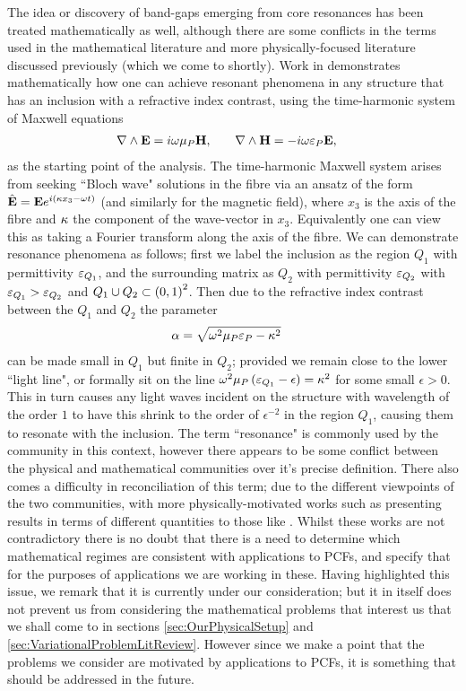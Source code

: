 The idea or discovery of band-gaps emerging from core resonances has been treated mathematically as well, although there are some conflicts in the terms used in the mathematical literature and more physically-focused literature discussed previously (which we come to shortly).
Work in \cite{cooper2014band} demonstrates mathematically how one can achieve resonant phenomena in any structure that has an inclusion with a refractive index contrast, using the time-harmonic system of Maxwell equations
\begin{align*}
	\nabla\wedge\mathbf{E} &= i\omega\mu_{P}\mathbf{H}, &\quad \nabla\wedge\mathbf{H} &= -i\omega\varepsilon_{P}\mathbf{E},
\end{align*}
as the starting point of the analysis.
The time-harmonic Maxwell system arises from seeking ``Bloch wave" solutions in the fibre via an ansatz of the form $\hat{\mathbf{E}}=\mathbf{E}e^{i\left( \kappa x_3-\omega t \right)}$ (and similarly for the magnetic field), where $x_3$ is the axis of the fibre and $\kappa$ the component of the wave-vector in $x_3$.
Equivalently one can view this as taking a Fourier transform along the axis of the fibre.
We can demonstrate resonance phenomena as follows; first we label the inclusion as the region $Q_1$ with permittivity $\varepsilon_{Q_1}$, and the surrounding matrix as $Q_2$ with permittivity $\varepsilon_{Q_2}$ with $\varepsilon_{Q_1}>\varepsilon_{Q_2}$ and $Q_1\cup Q_2\subset\left( 0,1 \right)^2$.
Then due to the refractive index contrast between the $Q_1$ and $Q_2$ the parameter
\begin{align*}
	\alpha &= \sqrt{\omega^2\mu_{P}\varepsilon_{P} - \kappa^2}
\end{align*}
can be made small in $Q_1$ but finite in $Q_2$; provided we remain close to the lower ``light line", or formally sit on the line $\omega^2\mu_{P}\left( \varepsilon_{Q_1}-\epsilon \right) = \kappa^2$ for some small $\epsilon>0$.
This in turn causes any light waves incident on the structure with wavelength of the order $1$ to have this shrink to the order of $\epsilon^{-2}$ in the region $Q_1$, causing them to resonate with the inclusion.
The term ``resonance" is commonly used by the community in this context, however there appears to be some conflict between the physical and mathematical communities over it's precise definition.
There also comes a difficulty in reconciliation of this term; due to the different viewpoints of the two communities, with more physically-motivated works such as \cite{birks2004scaling} presenting results in terms of different quantities to those like \cite{cooper2014band}.
Whilst these works are not contradictory there is no doubt that there is a need to determine which mathematical regimes are consistent with applications to PCFs, and specify that for the purposes of applications we are working in these.
Having highlighted this issue, we remark that it is currently under our consideration; but it in itself does not prevent us from considering the mathematical problems that interest us that we shall come to in sections \ref{sec:OurPhysicalSetup} and \ref{sec:VariationalProblemLitReview}.
However since we make a point that the problems we consider are motivated by applications to PCFs, it is something that should be addressed in the future.

